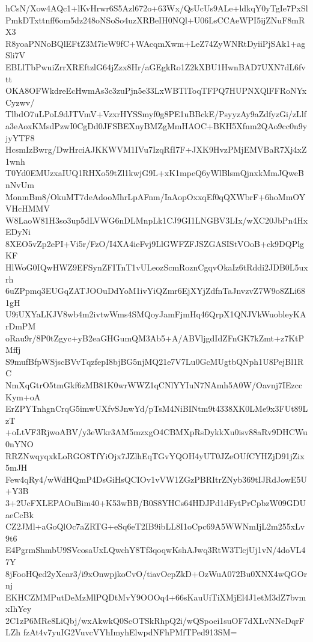 hCsN/Xow4AQc1+lKvHrwr6S5Azl672o+63Wx/QsUcUs9ALe+ldkqY0yTgIe7PxSl
PmkDTxttnff6om5dz248oNSoSo4uzXRBeIH0NQl+U06LsCCAeWPI5ijZNuF8mRX3
R8yoaPNNoBQlEFtZ3M7ieW9fC+WAcqmXwm+LeZ74ZyWNRtDyiiPjSAk1+agSli7V
EBLlTbPwuiZrrXREftzlG64jZzx8Hr/aGEgkRo1Z2kXBU1HwnBAD7UXN7dL6fvtt
OKA8OFWkdreEcHwmAs3c3zuPjn5e33LxWBTlToqTFPQ7HUPNXQlFFRoNYxCyzwv/
TlbdO7uLPoL9dJTVmV+VzxrHYSSmyf0g8PE1uBBckE/PsyyzAy9aZdfyzGi/zLlf
a3eAoxKMsdPzwI0CgDd0JFSBEXnyBMZgMmHAOC+BKH5Xfnm2QAo9cc0n9yjyYTF8
HcsmIzBwrg/DwHrciAJKKWVM1IVu7IzqRfI7F+JXK9HvzPMjEMVBaR7Xj4xZ1wnh
T0Yd0EMUzxaIUQ1RHXo59tZl1kwjG9L+xK1mpeQ6yWlBlsmQjnxkMmJQweBnNvUm
MonmBm8/OkuMT7deAdooMhrLpAFnm/IaAopOxxqEf0qQXWbrF+6hoMmOYVHcHMMV
W8LaoW81H3so3up5dLVWG6nDLMnpLk1CJ9GI1LNGBV3LIx/wXC20JbPn4HxEDyNi
8XEO5vZp2ePI+Vi5r/FzO/I4XA4ieFvj9LlGWFZFJSZGASIStVOoB+ck9DQPlgKF
HlWoG0IQwHWZ9EFSynZFITnT1vULeozScmRoznCgqvOkaIz6tRddi2JDB0L5uxrh
6uZPpmq3EUGqZATJOOuDdYoM1ivYiQZmr6EjXYjZdfnTaJnvzvZ7W9o8ZLi681gH
U9iUXYaLKJV8wb4m2ivtwWms4SMQoyJamFjmHq46QrpX1QNJVkWuobleyKArDmPM
oRau9r/8P0tZgyc+yB2eaGHGumQM3Ab5+A/ABVljgdIdZFnGK7kZmt+z7KtPMffj
S9mufBfpWSjscBVvTqzfepI8bjBG5njMQ21e7V7Lu0GcMUgtbQNph1U8PejBl1RC
NmXqGtrO5tmGkf6zMB81K0wrWWZ1qCNlYYIuN7NAmh5A0W/Oavnj7IEzccKym+oA
ErZPYTnhgnCrqG5imwUXfvSJnwYd/pTsM4NiBINtm9t4338XK0LMe9x3FUt89LzT
+oLtVF3RjwoABV/y3eWkr3AM5mzxgO4CBMXpRsDykkXu0isv88aRv9DHCWu0nYNO
RRZNwqyqxkLoRGO8TfYiOjx7JZlhEqTGvYQOH4yUT0JZeOUfCYHZjD91jZix5mJH
Few4qRy4/wWdHQmP4DsGiHsQCIOv1vVW1ZGzPBRItrZNyb369tIJRdJowE5U+Y3B
3+2UcFXLEPAOuBim40+K53wBB/B0S8YHCs64HDJPd1dFytPrCpbzW09GDUaeCcBk
CZ2JMl+aGoQlOc7aZRTG+eSq6eT2IB9ibLL8I1oCpc69A5WWNmIjL2m255xLv9t6
E4PgrmShmbU9SVcosaUxLQwchY8Tf3qoqwKshAJwq3RtW3TlcjUj1vN/4doVL47Y
8jFooHQed2yXear3/i9xOnwpjkoCvO/tiavOepZkD+OzWuA072Bu0XNX4wQGOrnj
EKHCZMMPutDeMzMlPQDtMvY9OOOq4+66sKauUiTiXMjEl4J1etM3dZ7bvmxIhYey
2C1zP6MRe8LiQbj/wxAkwkQ0ScOTSkRhpQ2i/wQSpoei1suOF7dXLvNNcDqrFLZh
fzAt4v7yuIG2VuvcVYhImyhElwpdNFhPMfTPed913SM=
